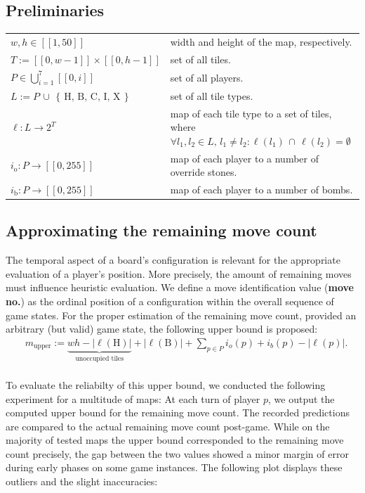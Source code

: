 \documentclass[article,fleqn,12pt]{article}
\begin{document}
\subsection{Preliminaries}
\bgroup
\renewcommand{\arraystretch}{1.5}
\begin{tabular}{l p{8cm}}
\(w, h \in \left[\!\left[1,50\right]\!\right]\) & width and height of the map, respectively. \\
\(T := \left[\!\left[0,w-1\right]\!\right] \times \left[\!\left[0,h-1\right]\!\right]\) & set of all tiles. \\
\(P \in \bigcup^7_{i=1}\left[\!\left[0,i\right]\!\right]\) & set of all players. \\
\(L := P \,\cup\, \left\{\,\text{H},\,\text{B},\,\text{C},\,\text{I},\,\text{X}\,\right\}\) & set of all tile types. \\
\(\ell : L \to 2^T\) & map of each tile type to a set of tiles, where \(\forall l_1, l_2 \in L,\,l_1 \neq l_2: \ell(l_1)\,\cap\,\ell(l_2) = \emptyset\) \\
\(i_{\text{o}}: P \to \left[\!\left[0,255\right]\!\right]\) & map of each player to a number of override stones. \\
\(i_{\text{b}}: P \to \left[\!\left[0,255\right]\!\right]\) & map of each player to a number of bombs.
\end{tabular}
\egroup

\vspace{15px}

\subsection{Approximating the remaining move count}
The temporal aspect of a board's configuration is relevant for the appropriate evaluation of a player's position. More precisely, the amount of remaining moves must influence heuristic evaluation. We define a move identification value (\textbf{move no.}) as the ordinal position of a configuration within the overall sequence of game states. For the proper estimation of the remaining move count, provided an arbitrary (but valid) game state, the following upper bound is proposed: 
\begin{align*}
& m_{\text{upper}} := \underbrace{wh - \left|\ell(\text{H})\right|}_{\text{unoccupied tiles}} + \left|\ell(\text{B})\right| + \sum_{p \in P} i_{o}(p) + i_{b}(p) - \left|\ell(p)\right|.
\end{align*} \\[-1em]

To evaluate the reliabilty of this upper bound, we conducted the following experiment for a multitude of maps: At each turn of player \(p\), we output the computed upper bound for the remaining move count. The recorded predictions are compared to the actual remaining move count post-game. While on the majority of tested maps the upper bound corresponded to the remaining move count precisely, the gap between the two values showed a minor margin of error during early phases on some game instances. The following plot displays these outliers and the slight inaccuracies:
\pagebreak
\end{document}

